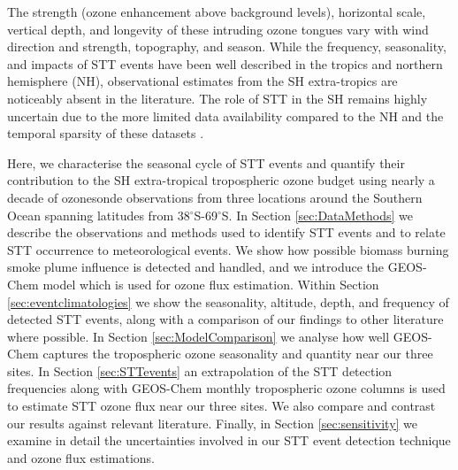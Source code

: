 \documentclass[acp, manuscript]{copernicus} %
\begin{document}
  The strength (ozone enhancement above background levels), horizontal scale, vertical depth, and longevity of these intruding ozone tongues vary with wind direction and strength, topography, and season.
  While the frequency, seasonality, and impacts of STT events have been well described in the tropics and northern hemisphere (NH), observational estimates from the SH extra-tropics are noticeably absent in the literature. 
  The role of STT in the SH remains highly uncertain due to the more limited data availability compared to the NH and the temporal sparsity of these datasets \citep{Mze2010, Thompson2014, Liu2015}. 

  Here, we characterise the seasonal cycle of STT events and quantify their contribution to the SH extra-tropical tropospheric ozone budget using nearly a decade of ozonesonde observations from three locations around the Southern Ocean spanning latitudes from 38$^{\circ}$S-69$^{\circ}$S. 
  In Section \ref{sec:DataMethods} we describe the observations and methods used to identify STT events and to relate STT occurrence to meteorological events. 
  We show how possible biomass burning smoke plume influence is detected and handled, and we introduce the GEOS-Chem model which is used for ozone flux estimation.
  Within Section \ref{sec:eventclimatologies} we show the seasonality, altitude, depth, and frequency of detected STT events, along with a comparison of our findings to other literature where possible. 
  In Section \ref{sec:ModelComparison} we analyse how well GEOS-Chem captures the tropospheric ozone seasonality and quantity near our three sites.
  In Section \ref{sec:STTevents} an extrapolation of the STT detection frequencies along with GEOS-Chem monthly tropospheric ozone columns is used to estimate STT ozone flux near our three sites. 
  We also compare and contrast our results against relevant literature. 
  Finally, in Section \ref{sec:sensitivity} we examine in detail the uncertainties involved in our STT event detection technique and ozone flux estimations.
\end{document}
